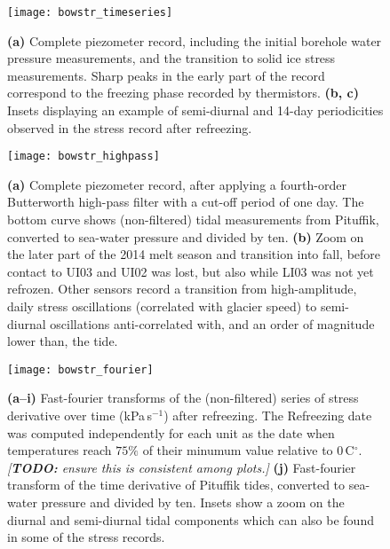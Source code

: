 \documentclass[utf8]{article}
\newcommand{\todo}[1]{\textcolor{c3}{\emph{[\textbf{TODO:} #1]}}}
\begin{document}
    \begin{figure}
      \centerline{\texttt{[image: bowstr\_timeseries]}}
      \caption{%
        \textbf{(a)}
          Complete piezometer record, including the initial borehole water
          pressure measurements, and the transition to solid ice stress
          measurements. Sharp peaks in the early part of the record correspond
          to the freezing phase recorded by thermistors.
        \textbf{(b, c)}
          Insets displaying an example of semi-diurnal and 14-day periodicities
          observed in the stress record after refreezing.}
      \label{fig:timeseries}
    \end{figure}

    \begin{figure}
      \centerline{\texttt{[image: bowstr\_highpass]}}
      \caption{%
        \textbf{(a)}
          Complete piezometer record, after applying a fourth-order Butterworth
          high-pass filter with a cut-off period of one day. The bottom curve
          shows (non-filtered) tidal measurements from Pituffik, converted to
          sea-water pressure and divided by ten.
        \textbf{(b)}
          Zoom on the later part of the 2014 melt season and transition into
          fall, before contact to UI03 and UI02 was lost, but also while LI03
          was not yet refrozen. Other sensors record a transition from
          high-amplitude, daily stress oscillations (correlated with glacier
          speed) to semi-diurnal oscillations anti-correlated with, and an
          order of magnitude lower than, the tide.}
      \label{fig:highpass}
    \end{figure}

    \begin{figure}
      \centerline{\texttt{[image: bowstr\_fourier]}}
      \caption{%
        \textbf{(a--i)}
          Fast-fourier transforms of the (non-filtered) series of stress
          derivative over time (kPa$\,$s$^{-1}$) after refreezing. The
          Refreezing date was computed independently for each unit as the date
          when temperatures reach $75\%$ of their minumum value relative to
          0$\,$C$^\circ$. \todo{ensure this is consistent among plots.}
        \textbf{(j)}
          Fast-fourier transform of the time derivative of Pituffik tides,
          converted to sea-water pressure and divided by ten. Insets show a
          zoom on the diurnal and semi-diurnal tidal components which can also
          be found in some of the stress records.}
      \label{fig:fourier}
    \end{figure}
\end{document}
